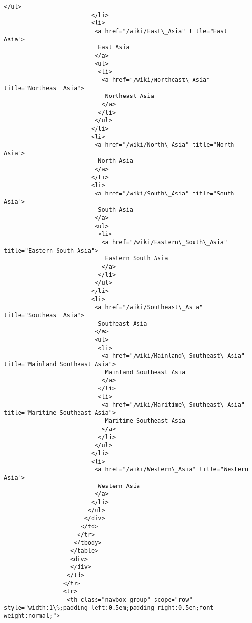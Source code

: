 \documentclass[11pt]{article}
\begin{document}
\begin{Verbatim}[commandchars=\\\{\}]
                          </ul>
                         </li>
                         <li>
                          <a href="/wiki/East\_Asia" title="East Asia">
                           East Asia
                          </a>
                          <ul>
                           <li>
                            <a href="/wiki/Northeast\_Asia" title="Northeast Asia">
                             Northeast Asia
                            </a>
                           </li>
                          </ul>
                         </li>
                         <li>
                          <a href="/wiki/North\_Asia" title="North Asia">
                           North Asia
                          </a>
                         </li>
                         <li>
                          <a href="/wiki/South\_Asia" title="South Asia">
                           South Asia
                          </a>
                          <ul>
                           <li>
                            <a href="/wiki/Eastern\_South\_Asia" title="Eastern South Asia">
                             Eastern South Asia
                            </a>
                           </li>
                          </ul>
                         </li>
                         <li>
                          <a href="/wiki/Southeast\_Asia" title="Southeast Asia">
                           Southeast Asia
                          </a>
                          <ul>
                           <li>
                            <a href="/wiki/Mainland\_Southeast\_Asia" title="Mainland Southeast Asia">
                             Mainland Southeast Asia
                            </a>
                           </li>
                           <li>
                            <a href="/wiki/Maritime\_Southeast\_Asia" title="Maritime Southeast Asia">
                             Maritime Southeast Asia
                            </a>
                           </li>
                          </ul>
                         </li>
                         <li>
                          <a href="/wiki/Western\_Asia" title="Western Asia">
                           Western Asia
                          </a>
                         </li>
                        </ul>
                       </div>
                      </td>
                     </tr>
                    </tbody>
                   </table>
                   <div>
                   </div>
                  </td>
                 </tr>
                 <tr>
                  <th class="navbox-group" scope="row" style="width:1\%;padding-left:0.5em;padding-right:0.5em;font-weight:normal;">

\end{Verbatim}
\end{document}
